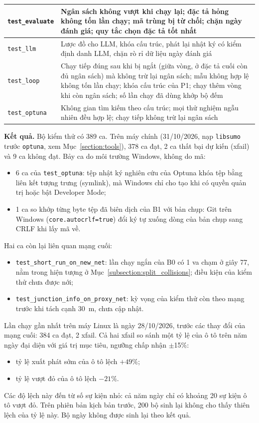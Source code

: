 \documentclass[../DoAn.tex]{subfiles}
\begin{document}
\begin{table}[H]
\begin{tabular}{|p{3.6cm}|p{9.4cm}|}
\texttt{test\_evaluate} & Ngân sách không vượt khi chạy lại; đặc tả hỏng không tốn lần chạy; mã trùng bị từ chối; chặn ngày đánh giá; quy tắc chọn đặc tả tốt nhất \\ \hline
\texttt{test\_llm} & Lược đồ cho LLM, khóa cấu trúc, phát lại nhật ký có kiểm định danh LLM, chặn rò rỉ dữ liệu ngày đánh giá \\ \hline
\texttt{test\_loop} & Chạy tiếp đúng sau khi bị ngắt (giữa vòng, ở đặc tả cuối còn đủ ngân sách) mà không trừ lại ngân sách; mẫu không hợp lệ không tốn lần chạy; khóa cấu trúc của P1; chạy thêm vòng khi còn ngân sách; số lần chạy đã dùng khớp bộ đếm \\ \hline
\texttt{test\_optuna} & Không gian tìm kiếm theo cấu trúc; mọi thử nghiệm ngẫu nhiên đều hợp lệ; chạy tiếp không trừ lại ngân sách \\ \hline
\end{tabular}
\end{table}

\textbf{Kết quả.} Bộ kiểm thử có 389 ca. Trên máy chính (31/10/2026, nạp \texttt{libsumo} trước \texttt{optuna}, xem Mục~\ref{section:tools}), 378 ca đạt, 2 ca thất bại dự kiến (xfail) và 9 ca không đạt. Bảy ca do môi trường Windows, không do mã:
\begin{itemize}
    \item 6 ca của \texttt{test\_optuna}: tệp nhật ký nghiên cứu của Optuna khóa tệp bằng liên kết tượng trưng (symlink), mà Windows chỉ cho tạo khi có quyền quản trị hoặc bật Developer Mode;
    \item 1 ca so khớp từng byte tệp đã biên dịch của B1 với bản chụp: Git trên Windows (\texttt{core.autocrlf=true}) đổi ký tự xuống dòng của bản chụp sang CRLF khi lấy mã về.
\end{itemize}
Hai ca còn lại liên quan mạng cuối:
\begin{itemize}
    \item \texttt{test\_short\_run\_on\_new\_net}: lần chạy ngắn của B0 có 1 va chạm ở giây 77, nằm trong hiện tượng ở Mục~\ref{subsection:split_collisions}; điều kiện của kiểm thử chưa được nới;
    \item \texttt{test\_junction\_info\_on\_proxy\_net}: kỳ vọng của kiểm thử còn theo mạng trước khi tách cạnh 30~m, chưa cập nhật.
\end{itemize}
Lần chạy gần nhất trên máy Linux là ngày 28/10/2026, trước các thay đổi của mạng cuối: 384 ca đạt, 2 xfail. Cả hai xfail so sánh một tỷ lệ của ô tô trên năm ngày đại diện với giá trị mục tiêu, ngưỡng chấp nhận $\pm$15\%:
\begin{itemize}
    \item tỷ lệ xuất phát sớm của ô tô lệch $+49\%$;
    \item tỷ lệ vượt đỏ của ô tô lệch $-21\%$.
\end{itemize}
Các độ lệch này đến từ số sự kiện nhỏ: cả năm ngày chỉ có khoảng 20 sự kiện ô tô vượt đỏ. Trên phiên bản kịch bản trước, 200 bộ sinh lại không cho thấy thiên lệch của tỷ lệ này. Bộ ngày không được sinh lại theo kết quả.
\end{document}
